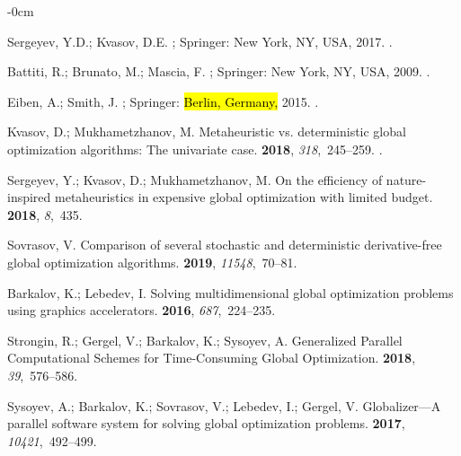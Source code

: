\documentclass[mathematics,article,accept,pdftex,moreauthors]{Definitions/mdpi}
\begin{document}
\begin{adjustwidth}{-\extralength}{0cm}
\begin{thebibliography}{999}
Sergeyev, Y.D.; Kvasov, D.E.
; Springer: New York, NY, USA,  2017.
.

Battiti, R.; Brunato, M.; Mascia, F.
; Springer: New
  York, NY, USA,  2009.
.

Eiben, A.; Smith, J.
; Springer:  \hl{Berlin, Germany,} %
  2015.
.

Kvasov, D.; Mukhametzhanov, M.
\newblock Metaheuristic vs. deterministic global optimization algorithms: The
  univariate case.
 {\bf 2018}, {\em 318},~245--259.
.

Sergeyev, Y.; Kvasov, D.; Mukhametzhanov, M.
\newblock On the efficiency of nature-inspired metaheuristics in expensive
  global optimization with limited budget.
 {\bf 2018}, {\em 8},~435.

Sovrasov, V.
\newblock Comparison of several stochastic and deterministic derivative-free
  global optimization algorithms.
 {\bf 2019}, {\em
  11548},~70--81.

Barkalov, K.; Lebedev, I.
\newblock Solving multidimensional global optimization problems using graphics
  accelerators.
 {\bf 2016},
  {\em 687},~224--235.

Strongin, R.; Gergel, V.; Barkalov, K.; Sysoyev, A.
\newblock Generalized Parallel Computational Schemes for Time-Consuming Global
  Optimization.
 {\bf 2018}, {\em
  39},~576--586.

Sysoyev, A.; Barkalov, K.; Sovrasov, V.; Lebedev, I.; Gergel, V.
\newblock Globalizer---A parallel software system for solving global
  optimization problems.
 {\bf 2017}, {\em
  10421},~492--499.


\end{thebibliography}
\end{adjustwidth}
\end{document}
